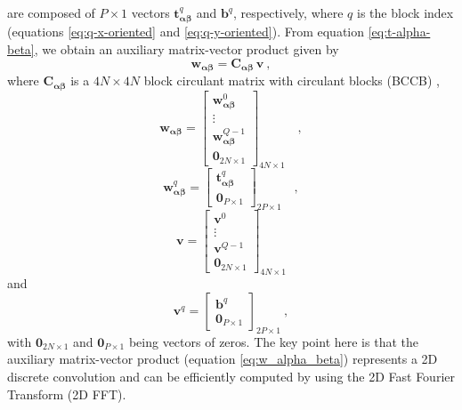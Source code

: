 \documentclass[manuscript,noblind]{geophysics}
\begin{document}
are composed of $P \times 1$ vectors $\mathbf{t}^{q}_{\boldsymbol{\alpha\beta}}$ and $\mathbf{b}^{q}$,
respectively, where $q$ is the block index (equations \ref{eq:q-x-oriented} and \ref{eq:q-y-oriented}). 
From equation \ref{eq:t-alpha-beta}, we obtain an auxiliary matrix-vector product given by
\begin{equation}
	\mathbf{w}_{\boldsymbol{\alpha\beta}} = \mathbf{C}_{\boldsymbol{\alpha\beta}} \, \mathbf{v} \: ,
	\label{eq:w_alpha_beta}
\end{equation}
where $\mathbf{C}_{\boldsymbol{\alpha\beta}}$ is a $4N \times 4N$ 
block circulant matrix with circulant blocks (BCCB) \citep[e.g., ][ p. 184]{davis1979},
\begin{equation}
	\mathbf{w}_{\boldsymbol{\alpha\beta}} = \begin{bmatrix}
		\mathbf{w}_{\boldsymbol{\alpha\beta}}^{0} \\
		\vdots \\
		\mathbf{w}_{\boldsymbol{\alpha\beta}}^{Q - 1} \\
		\mathbf{0}_{2N \times 1}
	\end{bmatrix}_{4N \times 1} \quad ,
	\label{eq:w_alpha_beta_partitioned}
\end{equation}
\begin{equation}
	\mathbf{w}_{\boldsymbol{\alpha\beta}}^{q} = \begin{bmatrix}
		\mathbf{t}^{q}_{\boldsymbol{\alpha\beta}} \\
		\mathbf{0}_{P \times 1}
	\end{bmatrix}_{2P \times 1}
	\label{eq:wq-vector} \quad ,
\end{equation}
\begin{equation}
	\mathbf{v} = \begin{bmatrix}
		\mathbf{v}^{0} \\
		\vdots \\
		\mathbf{v}^{Q - 1} \\
		\mathbf{0}_{2N \times 1}
	\end{bmatrix}_{4N \times 1}
	\label{eq:v-vector}
\end{equation}
and
\begin{equation}
	\mathbf{v}^{q} = \begin{bmatrix}
		\mathbf{b}^{q} \\
		\mathbf{0}_{P \times 1}
	\end{bmatrix}_{2P \times 1} \: ,
	\label{eq:vq-vector} 
\end{equation}
with $\mathbf{0}_{2N \times 1}$ and $\mathbf{0}_{P \times 1}$ being vectors of zeros.
The key point here is that the auxiliary matrix-vector product
(equation \ref{eq:w_alpha_beta}) represents a 2D discrete convolution and can be 
efficiently computed by using the 2D Fast Fourier Transform (2D FFT). 
\end{document}
